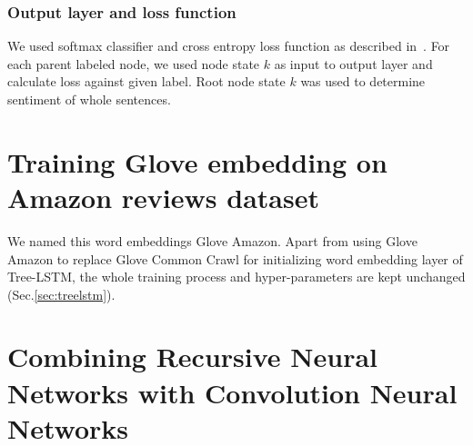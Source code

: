 \subsubsection{Output layer and loss function}
We used softmax classifier and cross entropy loss function as described in~\cite{treeLSTM}.  
For each parent labeled node, we used node state $k$ as input to output layer and calculate loss against given label. 
Root node state $k$ was used to determine sentiment of whole sentences.

\hypertarget{sec:Glove-Amazon}{\section{Training Glove embedding on Amazon reviews dataset}}
\label{sec:gloveamazone}
We named this word embeddings Glove Amazon.
Apart from using Glove Amazon to replace Glove Common Crawl for initializing word embedding layer of Tree-LSTM, the whole training process and hyper-parameters are kept unchanged (Sec.\ref{sec:treelstm}).

\hypertarget{sec:CNNtree}{\section{Combining Recursive Neural Networks with Convolution Neural Networks}}\label{sec:CNNtree}

